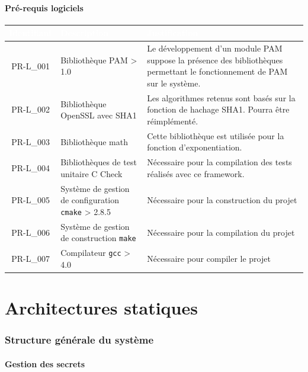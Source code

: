 \documentclass{"../../res/univ-projet"}
\begin{document}
\subsection{Pré-requis logiciels}
\begin{tabular}{|c|p{}|p{}|}
\hline
\rowcolor{gray}
\textcolor{white}{\bfseries Identifiant} & 
\textcolor{white}{\bfseries Description} &
\textcolor{white}{\bfseries Justification} \\
\hline
PR-L\_001 &
Bibliothèque PAM > 1.0 &
Le développement d'un module PAM suppose la présence des bibliothèques permettant
le fonctionnement de PAM sur le système. \\
\hline
PR-L\_002 &
Bibliothèque OpenSSL avec SHA1 &
Les algorithmes retenus sont basés sur la fonction de hachage SHA1. Pourra être réimplémenté. \\
\hline
PR-L\_003 &
Bibliothèque math &
Cette bibliothèque est utilisée pour la fonction d'exponentiation. \\
\hline
PR-L\_004 &
Bibliothèques de test unitaire C Check &
Nécessaire pour la compilation des tests réalisés avec ce framework.\\
\hline
PR-L\_005 &
Système de gestion de configuration \verb?cmake? > 2.8.5&
Nécessaire pour la construction du projet\\
\hline
PR-L\_006 &
Système de gestion de construction \verb?make? &
Nécessaire pour la compilation du projet\\
\hline
PR-L\_007 &
Compilateur \verb?gcc? > 4.0 &
Nécessaire pour compiler le projet\\
\hline
\end{tabular}


\part*{Architectures statiques}
\section{Structure générale du système}

\subsection{Gestion des secrets}
\end{document}

